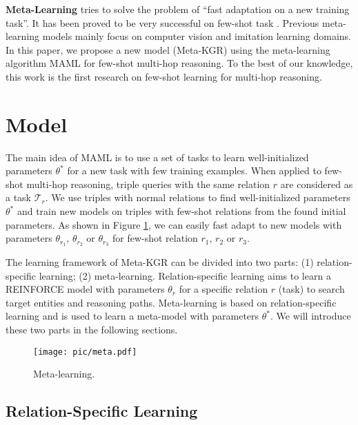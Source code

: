 \documentclass[11pt,a4paper]{article}
\begin{document}
\textbf{Meta-Learning} tries to solve the problem of ``fast adaptation on a new training task''. It has been proved to be very successful on few-shot task \cite{lake2015human, meta-translate}. Previous meta-learning models mainly focus on computer vision and imitation learning domains. In this paper, we propose a new model (Meta-KGR) using the meta-learning algorithm MAML \cite{MAML} for few-shot multi-hop reasoning. To the best of our knowledge, this work is the first research on few-shot learning for multi-hop reasoning.







\section{Model}

The main idea of MAML is to use a set of tasks to learn well-initialized parameters $\theta^*$ for a new task with few training examples. When applied to few-shot multi-hop reasoning, triple queries with the same relation $r$ are considered as a task $\mathcal{T}_r$. We use triples with normal relations to find well-initialized parameters $\theta^*$ and train new models on triples with few-shot relations from the found initial parameters. As shown in Figure \ref{meta}, we can easily fast adapt to new models with parameters $\theta_{r_1}$, $\theta_{r_2}$ or $\theta_{r_3}$ for few-shot relation $r_1$, $r_2$ or $r_3$. 

The learning framework of Meta-KGR can be divided into two parts: (1) relation-specific learning; (2) meta-learning. Relation-specific learning aims to learn a REINFORCE model with parameters $\theta_r$ for a specific relation $r$ (task) to search target entities and reasoning paths. Meta-learning is based on relation-specific learning and is used to learn a meta-model with parameters $\theta^*$.
We will introduce these two parts in the following sections.

\begin{figure}[t]
\centering
\setlength{\abovecaptionskip}{2pt}
\setlength{\belowcaptionskip}{0pt}
\texttt{[image: pic/meta.pdf]}
\caption{Meta-learning.}
\label{meta}
\end{figure}


\subsection{Relation-Specific Learning}
\end{document}
